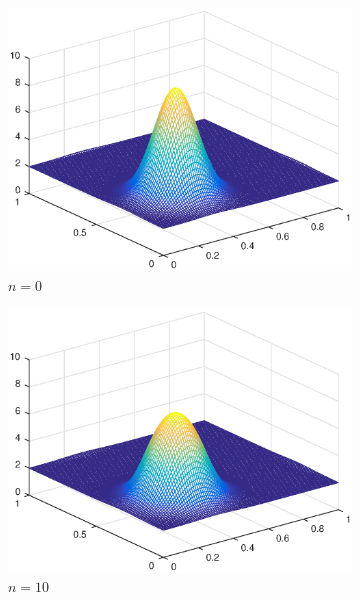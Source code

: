 \begin{figure}[h!]
    \centering
    \begin{subfigure}[t]{0.48\textwidth}
        \centering
        \includegraphics[width=\textwidth]{images/sol_ds_0000.eps}
        \caption{$n=0$}
        \label{fig:0}
    \end{subfigure}
    \begin{subfigure}[t]{0.48\textwidth}
        \centering
        \includegraphics[width=\textwidth]{images/sol_ds_0010.eps}
        \caption{$n=10$}
        \label{fig:10}
    \end{subfigure}
    \begin{subfigure}[t]{0.48\textwidth}
        \centering

\end{subfigure}
\end{figure}
